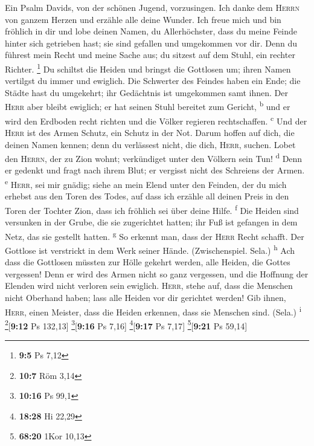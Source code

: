  Ein Psalm Davids, von der schönen Jugend, vorzusingen.
 Ich danke dem \textsc{Herrn} von ganzem Herzen und
erzähle alle deine Wunder.  Ich freue mich und bin
fröhlich in dir und lobe deinen Namen, du Allerhöchster, 
dass du meine Feinde hinter sich getrieben hast; sie sind gefallen und
umgekommen vor dir.  Denn du führest mein Recht und meine
Sache aus; du sitzest auf dem Stuhl, ein rechter Richter. \footnote{\textbf{9:5}
  Ps 7,12}  Du schiltst die Heiden und bringst die
Gottlosen um; ihren Namen vertilgst du immer und ewiglich.
 Die Schwerter des Feindes haben ein Ende; die Städte hast
du umgekehrt; ihr Gedächtnis ist umgekommen samt ihnen. 
Der \textsc{Herr} aber bleibt ewiglich; er hat seinen Stuhl bereitet zum
Gericht, \textsuperscript{b}  und er wird den Erdboden
recht richten und die Völker regieren rechtschaffen. \textsuperscript{c}
 Und der \textsc{Herr} ist des Armen Schutz, ein Schutz
in der Not.  Darum hoffen auf dich, die deinen Namen
kennen; denn du verlässest nicht, die dich, \textsc{Herr}, suchen.
 Lobet den \textsc{Herrn}, der zu Zion wohnt; verkündiget
unter den Völkern sein Tun! \textsuperscript{d}  Denn er
gedenkt und fragt nach ihrem Blut; er vergisst nicht des Schreiens der
Armen. \textsuperscript{e}  \textsc{Herr}, sei mir
gnädig; siehe an mein Elend unter den Feinden, der du mich erhebst aus
den Toren des Todes,  auf dass ich erzähle all deinen
Preis in den Toren der Tochter Zion, dass ich fröhlich sei über deine
Hilfe. \textsuperscript{f}  Die Heiden sind versunken in
der Grube, die sie zugerichtet hatten; ihr Fuß ist gefangen in dem Netz,
das sie gestellt hatten. \textsuperscript{g}  So erkennt
man, dass der \textsc{Herr} Recht schafft. Der Gottlose ist verstrickt
in dem Werk seiner Hände. (Zwischenspiel. Sela.) \textsuperscript{h}
 Ach dass die Gottlosen müssten zur Hölle gekehrt werden,
alle Heiden, die Gottes vergessen!  Denn er wird des
Armen nicht so ganz vergessen, und die Hoffnung der Elenden wird nicht
verloren sein ewiglich.  \textsc{Herr}, stehe auf, dass
die Menschen nicht Oberhand haben; lass alle Heiden vor dir gerichtet
werden!  Gib ihnen, \textsc{Herr}, einen Meister, dass
die Heiden erkennen, dass sie Menschen sind. (Sela.) \textsuperscript{i}
\footnote{\textbf{10:7} Röm 3,14}{[}\textbf{9:12} Ps 132,13{]}
\footnote{\textbf{10:16} Ps 99,1}{[}\textbf{9:16} Ps 7,16{]}
\footnote{\textbf{18:28} Hi 22,29}{[}\textbf{9:17} Ps 7,17{]}
\footnote{\textbf{68:20} 1Kor 10,13}{[}\textbf{9:21} Ps 59,14{]}


